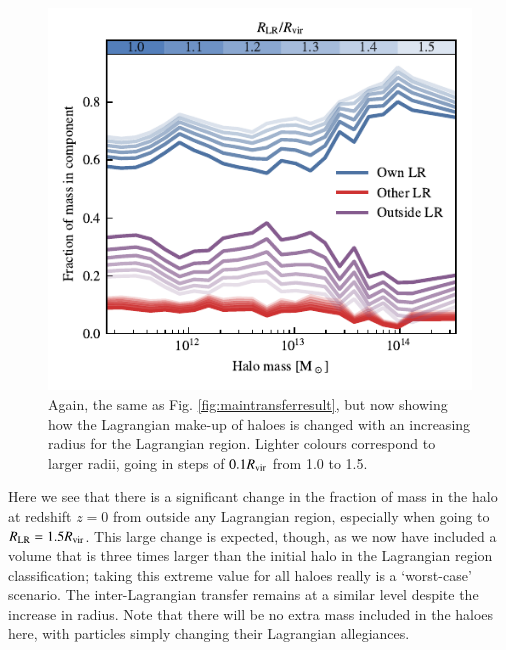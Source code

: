 \begin{figure}
    \centering
    \includegraphics{figures/radius_convergence.pdf}
    \vspace{-0.7cm}
    \caption{Again, the same as Fig. \ref{fig:maintransferresult}, but now
    showing how the Lagrangian make-up of haloes is changed with an increasing
    radius for the Lagrangian region. Lighter colours correspond to larger
    radii, going in steps of $0.1R_{\rm vir}$ from 1.0 to 1.5.}
    \label{fig:radius_dependence}
\end{figure}

Here we see that there is a significant change in the fraction of mass in the
halo at redshift $z=0$ from outside any Lagrangian region, especially when going to
$R_{\rm LR} = 1.5 R_{\rm vir}$. This large change is expected, though, as we now
have included a volume that is three times larger than the initial halo in the
Lagrangian region classification; taking this extreme value for all haloes
really is a `worst-case' scenario. The inter-Lagrangian transfer remains at a similar level
despite the increase in radius. Note that there will be no extra mass included in the
haloes here, with particles simply changing their Lagrangian allegiances.